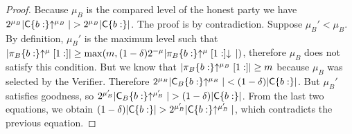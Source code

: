 \begin{proof}
    Because $\mu_B$ is the compared level of the honest party we have
    $2^{\mu_B}|\mathsf{C}\{b:\}\negthickspace\uparrow^{\mu_B}| > 2^{\mu_B}|\mathsf{C}\{b:\}|$.
    The proof is by contradiction. Suppose $\mu_B' < \mu_B$.
    By definition, $\mu_B'$ is the maximum level such that
    $|\pi_B\{b:\}\negthickspace\uparrow^\mu[1:]| \geq \max(m, (1 -
    \delta)2^{-\mu}|\pi_B\{b:\}\negthickspace\uparrow^\mu[1:]\negthickspace\downarrow\,|)$, therefore
    $\mu_B$ does not satisfy this condition. But we know that
    $|\pi_B\{b:\}\negthickspace\uparrow^{\mu_B}[1:]| \geq m$ because $\mu_B$ was selected by
    the Verifier. Therefore
    $2^{\mu_B}|\mathsf{C}_B\{b:\}\negthickspace\uparrow^{\mu_B}| < (1 - \delta)|\mathsf{C}\{b:\}|$.
    But $\mu_B'$ satisfies goodness, so
    $2^{\mu_B'}|\mathsf{C}_B\{b:\}\negthickspace\uparrow^{\mu_B'}| > (1 - \delta)|\mathsf{C}\{b:\}|$.
    From the last two equations, we obtain
    $(1 - \delta)|\mathsf{C}\{b:\}| > 2^{\mu_B'}|\mathsf{C}\{b:\}\negthickspace\uparrow^{\mu_B'}|$,
    which contradicts the previous equation.
\end{proof}
